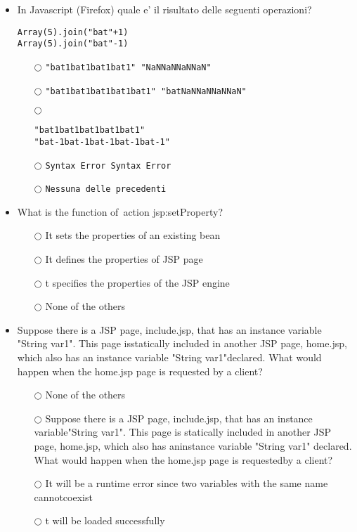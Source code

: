 \documentclass[10pt,twocolumn]{article}
\begin{document}
\begin{itemize}
    \item In Javascript (Firefox) quale e' il risultato delle seguenti operazioni?
          \begin{verbatim}
Array(5).join("bat"+1)
Array(5).join("bat"-1)
\end{verbatim}
          \begin{itemize}
              \item[$\bigcirc$] \verb="bat1bat1bat1bat1" "NaNNaNNaNNaN"=
              \item[$\bigcirc$] \verb="bat1bat1bat1bat1bat1" "batNaNNaNNaNNaN"=
              \item[$\bigcirc$]
                    \begin{verbatim}
"bat1bat1bat1bat1bat1"
"bat-1bat-1bat-1bat-1bat-1"
\end{verbatim}
              \item[$\bigcirc$] \verb=Syntax Error Syntax Error=
              \item[$\bigcirc$] \verb=Nessuna delle precedenti=
          \end{itemize}
\end{itemize}
\begin{itemize}
    \item What is the function of action jsp:setProperty?
          \begin{itemize}
              \item[$\bigcirc$] It sets the properties of an existing bean
              \item[$\bigcirc$] It defines the properties of JSP page
              \item[$\bigcirc$] t specifies the properties of the JSP engine
              \item[$\bigcirc$] None of the others
          \end{itemize}
\end{itemize}
\begin{itemize}
    \item Suppose there is a JSP page, include.jsp, that has an instance variable "String var1". This page isstatically included in another JSP page, home.jsp, which also has an instance variable "String var1"declared. What would happen when the home.jsp page is requested by a client?
          \begin{itemize}
              \item[$\bigcirc$] None of the others
              \item[$\bigcirc$] Suppose there is a JSP page, include.jsp, that has an instance variable"String var1". This page is statically included in another JSP page, home.jsp, which also has aninstance variable "String var1" declared. What would happen when the home.jsp page is requestedby a client?
              \item[$\bigcirc$] It will be a runtime error since two variables with the same name cannotcoexist
              \item[$\bigcirc$] t will be loaded successfully
          \end{itemize}
\end{itemize}
\end{document}
